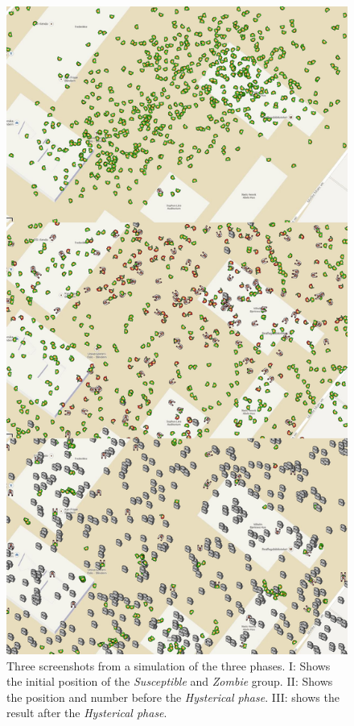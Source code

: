 \documentclass[%
twoside,                 %
final,                   %
chapterprefix=true,      %
open=right               %
10pt]{book}
\begin{document}
\vspace{3mm}




\vspace{3mm}




\begin{figure}[ht]
  \centerline{\includegraphics[width=0.8\linewidth]{3_fig/three_phases_random.png}}
  \caption{
  \label{fig:screenshots_three_phases} Three screenshots from a simulation of the three phases. I: Shows the initial position of the \emph{Susceptible} and \emph{Zombie} group. II: Shows the position and number before the \emph{Hysterical phase}. III: shows the result after the \emph{Hysterical phase}.
  }
\end{figure}
\end{document}
